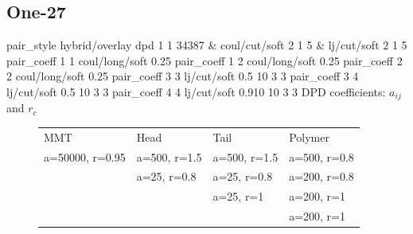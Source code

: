 \documentclass[a4paper]{article}
\begin{document}
\subsection*{One-27}
pair\_style hybrid/overlay dpd 1 1 34387 \& coul/cut/soft 2 1 5 \& 
lj/cut/soft 2 1 5\newline
pair\_coeff 1 1 coul/long/soft 0.25\newline
pair\_coeff 1 2 coul/long/soft 0.25\newline
pair\_coeff 2 2 coul/long/soft 0.25\newline
pair\_coeff 3 3 lj/cut/soft 0.5   10 3 3\newline
pair\_coeff 3 4 lj/cut/soft 0.5   10 3 3\newline
pair\_coeff 4 4 lj/cut/soft 0.910 10 3 3\newline
DPD coefficients: $a_{ij}$ and $r_c$
\begin{figure}[H]\begin{tabular}{llll}
MMT             & Head         & Tail         & Polymer      \\
a=50000, r=0.95 & a=500, r=1.5 & a=500, r=1.5 & a=500, r=0.8 \\
                & a=25,  r=0.8 & a=25,  r=0.8 & a=200, r=0.8 \\
                &              & a=25,  r=1   & a=200, r=1   \\
                &              &              & a=200, r=1   \\
\end{tabular}\end{figure}
\end{document}

